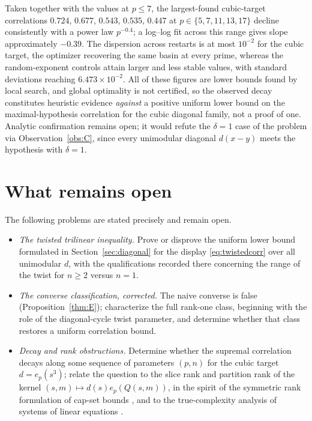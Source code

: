 \documentclass[11pt]{article}
\theoremstyle{remark}
\begin{document}
Taken together with the values at $p\le7$, the largest-found cubic-target
correlations $0.724$, $0.677$, $0.543$, $0.535$, $0.447$ at
$p\in\{5,7,11,13,17\}$ decline consistently with a power law $p^{-0.4}$; a
log--log fit across this range gives slope approximately $-0.39$. The
dispersion across restarts is at most $10^{-2}$ for the cubic target, the
optimizer recovering the same basin at every prime, whereas the
random-exponent controls attain larger and less stable values, with standard
deviations reaching $6.473\times10^{-2}$. All of these figures are lower
bounds found by local search, and global optimality is not certified, so the
observed decay constitutes heuristic evidence \emph{against} a positive
uniform lower bound on the maximal-hypothesis correlation for the cubic
diagonal family, not a proof of one. Analytic confirmation remains open;
it would refute the $\delta=1$ case of the problem via
Observation~\ref{obs:C}, since every unimodular diagonal $d(x-y)$ meets the
hypothesis with $\delta=1$.

\section{What remains open}\label{sec:open}

The following problems are stated precisely and remain open.

\begin{itemize}
\item[\textnormal{(O1)}] \emph{The twisted trilinear inequality.} Prove or
disprove the uniform lower bound formulated in Section~\ref{sec:diagonal}
for the display \eqref{eq:twistedcorr} over all unimodular $d$, with the
qualifications recorded there concerning the range of the twist for $n\ge2$
versus $n=1$.
\item[\textnormal{(O2)}] \emph{The converse classification, corrected.} The
naive converse is false (Proposition~\ref{thm:E}); characterize the full
rank-one class, beginning with the role of the diagonal-cycle twist
parameter, and determine whether that class restores a uniform correlation
bound.
\item[\textnormal{(O3)}] \emph{Decay and rank obstructions.} Determine
whether the supremal correlation decays along some sequence of parameters
$(p,n)$ for the cubic target $d=e_p(s^{3})$; relate the question to the
slice rank and partition rank of the kernel
$(s,m)\mapsto d(s)e_p(Q(s,m))$, in the spirit of the symmetric rank
formulation of cap-set bounds \cite{tao2016}, and to the true-complexity
analysis of systems of linear equations \cite{gowerswolf2010}.
\end{itemize}
\end{document}
